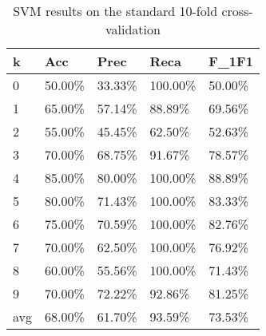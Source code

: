 \documentclass{article}
\begin{document}
\begin{table}[h]
	\centering
	\caption{SVM results on the standard 10-fold cross-validation}
	\begin{tabular}{|l|l|l|l|l|}
	\hline
	\textbf{k} & \textbf{Acc} & \textbf{Prec} & \textbf{Reca} & \textbf{F\_1F1} \\ \hline
	0          & 50.00\%      & 33.33\%       & 100.00\%      & 50.00\%         \\ \hline
	1          & 65.00\%      & 57.14\%       & 88.89\%       & 69.56\%         \\ \hline
	2          & 55.00\%      & 45.45\%       & 62.50\%       & 52.63\%         \\ \hline
	3          & 70.00\%      & 68.75\%       & 91.67\%       & 78.57\%         \\ \hline
	4          & 85.00\%      & 80.00\%       & 100.00\%      & 88.89\%         \\ \hline
	5          & 80.00\%      & 71.43\%       & 100.00\%      & 83.33\%         \\ \hline
	6          & 75.00\%      & 70.59\%       & 100.00\%      & 82.76\%         \\ \hline
	7          & 70.00\%      & 62.50\%       & 100.00\%      & 76.92\%         \\ \hline
	8          & 60.00\%      & 55.56\%       & 100.00\%      & 71.43\%         \\ \hline
	9          & 70.00\%      & 72.22\%       & 92.86\%       & 81.25\%         \\ \hline
	avg        & 68.00\%      & 61.70\%       & 93.59\%       & 73.53\%         \\ \hline
	\end{tabular}
	\end{table}
\end{document}
